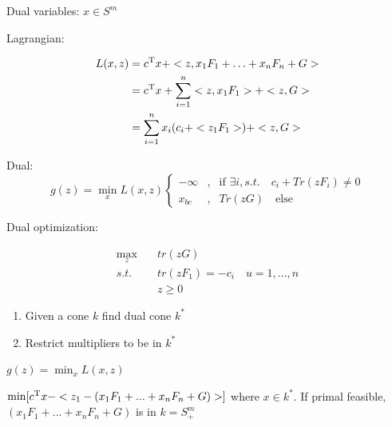 Dual variables: $x\in S^m$

Lagrangian:

\begin{align*}
L(x,z) &= c^{{\rm T}}x + <z,x_1F_1+\ldots +x_nF_n+G>\\
&= c^{{\rm T}}x + \sum^n_{i=1}<z,x_1F_1>+<z,G>\\
&= \sum^n_{i=1}x_i(c_i+<z_1F_1>)+<z,G>
\end{align*}

Dual:
\begin{equation}
\label{eq6}
g(z) = \min_x L(x,z)\left\{
\begin{aligned}
-\infty & , & \text{if }\exists i,s.t.\quad c_i+Tr(zF_i)\neq0 \\
x_{bc} & , & Tr(zG)\quad\text{else}
\end{aligned}
\right.
\end{equation}

Dual optimization:

\begin{align*}
\max_z\quad &tr(zG)\\
s.t.\quad &tr(zF_1)=-c_i\quad u=1,...,n\\
&z\geq 0
\end{align*}

\begin{enumerate}
	\item Given a cone $k$ find dual cone $k^*$
	
	\item Restrict multipliers to be in $k^*$
\end{enumerate}


$g(z)=\min_x L(x,z)$

$\min[c^{{\rm T}}x-<z_1-(x_1F_1+...+x_nF_n+G)>]$ where $x\in k^*$. If primal feasible, $(x_1F_1+...+x_nF_n+G)$ is in $k=S^m_+$





